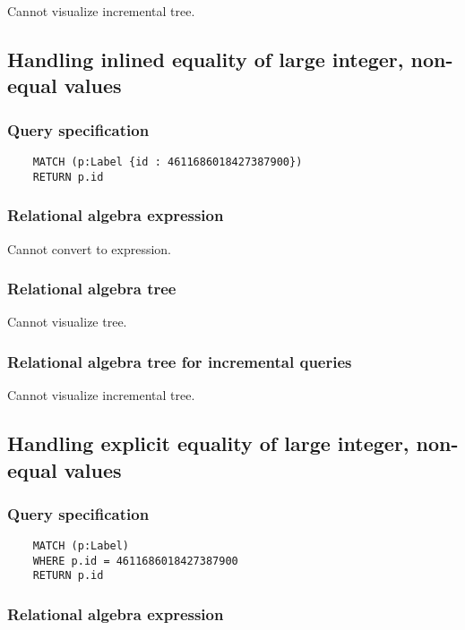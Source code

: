 	Cannot visualize incremental tree.
	\subsection{Handling inlined equality of large integer, non-equal values}

	\subsubsection*{Query specification}

	\begin{lstlisting}
	MATCH (p:Label {id : 4611686018427387900})
	RETURN p.id
	\end{lstlisting}


	\subsubsection*{Relational algebra expression}

	Cannot convert to expression.

	\subsubsection*{Relational algebra tree}

	Cannot visualize tree.

	\subsubsection*{Relational algebra tree for incremental queries}

	Cannot visualize incremental tree.
	\subsection{Handling explicit equality of large integer, non-equal values}

	\subsubsection*{Query specification}

	\begin{lstlisting}
	MATCH (p:Label)
	WHERE p.id = 4611686018427387900
	RETURN p.id
	\end{lstlisting}


	\subsubsection*{Relational algebra expression}

